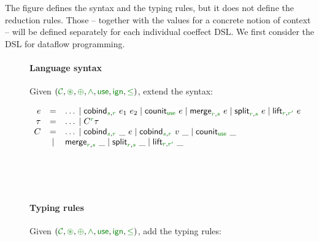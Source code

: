 The figure defines the syntax and the typing rules, but it does not define the reduction rules.
Those -- together with the values for a concrete notion of context -- will be defined separately
for each individual coeffect DSL. We first consider the DSL for dataflow programming.


\begin{figure}[t]
\paragraph{Language syntax}
Given $(\C, \cseq, \cpar, \czip, \cunit, \czero, \cleq)$, extend the syntax:

\begin{equation*}
\begin{array}{rcl}
  e &  =  &\ldots \sep\ident{cobind}_{\cclrd{s},\cclrd{r}}~e_1~e_2 \sep \ident{counit}_{\cunit}~e \sep \ident{merge}_{\cclrd{r},\cclrd{s}}~e 
         \sep \ident{split}_{\cclrd{r},\cclrd{s}}~e \sep \ident{lift}_{\cclrd{r},\cclrd{r'}}~e \\
  \tau &  = &\ldots \sep \ctyp{\cclrd{r}}{\tau} \\
  C  & = &\ldots \sep \ident{cobind}_{\cclrd{s},\cclrd{r}}~\_~e \sep \ident{cobind}_{\cclrd{s},\cclrd{r}}~v~\_ \sep \ident{counit}_{\cunit}~\_ \\
    &\sep& \ident{merge}_{\cclrd{r},\cclrd{s}}~\_
           \sep \ident{split}_{\cclrd{r},\cclrd{s}}~\_ \sep \ident{lift}_{\cclrd{r},\cclrd{r'}}~\_ \\
  
\end{array}
\end{equation*}

~

~

\paragraph{Typing rules}
Given $(\C, \cseq, \cpar, \czip, \cunit, \czero, \cleq)$, add the typing rules:


\end{figure}
